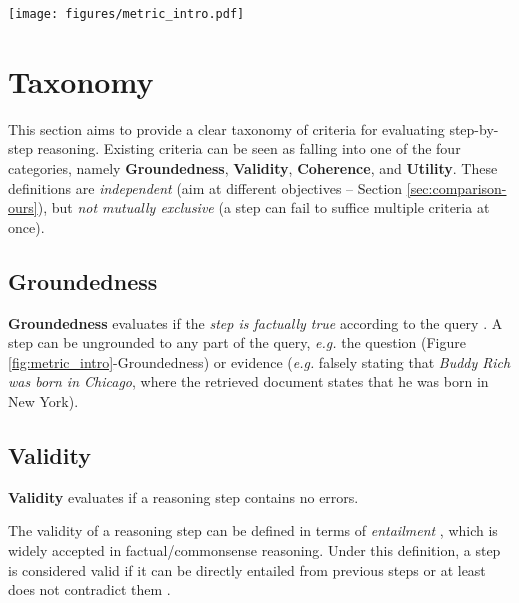 \begin{figure*}[t]
    \centering
    \texttt{[image: figures/metric\_intro.pdf]}
    \caption{Illustration of the proposed categories of step-by-step reasoning evaluation criteria, \textit{i.e.} groundedness, validity, coherence, and utility. 
    The left shows an example of a query and a reasoning trace. The other four blocks demonstrate examples that fail to suffice the respective metric. Red filled rectangles indicate the error's location, and the outlined boxes and arrows show the cause of the error.}
    \label{fig:metric_intro}
\end{figure*}

\section{Taxonomy}
\label{sec:taxonomy}


This section aims to provide a clear taxonomy of criteria for evaluating step-by-step reasoning. Existing criteria can be seen as falling into one of the four categories, namely \textbf{Groundedness}, \textbf{Validity}, \textbf{Coherence}, and \textbf{Utility}. These definitions are \textit{independent} (aim at different objectives -- Section \ref{sec:comparison-ours}), but \textit{not mutually exclusive} (a step can fail to suffice multiple criteria at once).

\subsection{Groundedness}

\textbf{Groundedness} evaluates if the \textit{step is factually true} according to the query \citep{NEURIPS2020_6b493230, gao2024retrievalaugmentedgenerationlargelanguage}. A step can be ungrounded to any part of the query, \textit{e.g.} the question (Figure \ref{fig:metric_intro}-Groundedness) or evidence (\textit{e.g.} falsely stating that \textit{Buddy Rich was born in Chicago}, where the retrieved document states that he was born in New York). 

\subsection{Validity}

\textbf{Validity} evaluates if a reasoning step contains no errors.

The validity of a reasoning step can be defined in terms of \textit{entailment} \citep{bowman-etal-2015-large}, which is widely accepted in factual/commonsense reasoning. Under this definition, a step is considered valid if it can be directly entailed from previous steps \citep{tafjord-etal-2021-proofwriter, dalvi-etal-2021-explaining, PrOntoQA} or at least does not contradict them \citep{DBLP:conf/iclr/GolovnevaCPCZFC23, prasad-etal-2023-receval, zhu2024deductivebeamsearchdecoding}.

